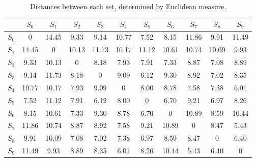 \documentclass[11pt]{article}
\begin{document}
\begin{table}
\centering
\small
\begin{tabular}{c|cccccccccc}
&$S_0$&$S_1$&$S_2$&$S_3$&$S_4$&$S_5$&$S_6$&$S_7$&$S_8$&$S_9$\\\hline
$S_0$&0&14.45&9.33&9.14&10.77&7.52&8.15&11.86&9.91&11.49\\
$S_1$&14.45&0&10.13&11.73&10.17&11.12&10.61&10.74&10.09&9.93\\
$S_2$&9.33&10.13&0&8.18&7.93&7.91&7.33&8.87&7.08&8.89\\
$S_3$&9.14&11.73&8.18&0&9.09&6.12&9.30&8.92&7.02&8.35\\
$S_4$&10.77&10.17&7.93&9.09&0&8.00&8.78&7.58&7.38&6.01\\
$S_5$&7.52&11.12&7.91&6.12&8.00&0&6.70&9.21&6.97&8.26\\
$S_6$&8.15&10.61&7.33&9.30&8.78&6.70&0&10.89&8.59&10.44\\
$S_7$&11.86&10.74&8.87&8.92&7.58&9.21&10.89&0&8.47&5.43\\
$S_8$&9.91&10.09&7.08&7.02&7.38&6.97&8.59&8.47&0&6.40\\
$S_9$&11.49&9.93&8.89&8.35&6.01&8.26&10.44&5.43&6.40&0
\end{tabular}
\caption{Distances between each set, determined by Euclidean measure.}
\normalsize
\end{table}
\end{document}
